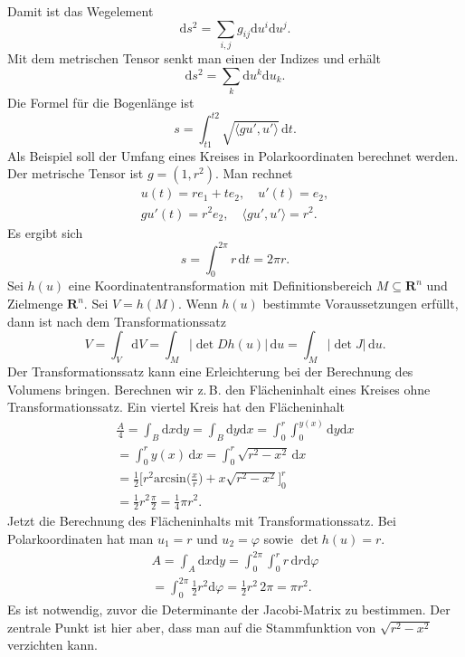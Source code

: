 \documentclass[a4paper,11pt,fleqn,twocolumn,twoside]{scrartcl}
\numberwithin{equation}{section}
\begin{document}
Damit ist das Wegelement
\begin{equation}
\mathrm ds^2 = \sum_{i,j} g_{ij}\mathrm du^i\mathrm du^j.
\end{equation}
Mit dem metrischen Tensor senkt man einen der Indizes
und erhält
\begin{equation}
\mathrm ds^2 = \sum_{k}\mathrm du^k\mathrm du_k.
\end{equation}
Die Formel für die Bogenlänge ist
\begin{equation}
s = \int_{t1}^{t2}
\sqrt{\langle gu',u'\rangle}\,\mathrm dt.
\end{equation}
%
Als Beispiel soll der Umfang eines Kreises in Polarkoordinaten
berechnet werden. Der metrische Tensor ist $g=(1,r^2)$.
Man rechnet
\begin{gather*}
u(t)=re_1+te_2,\quad
u'(t) = e_2,\\
gu'(t) = r^2e_2,\quad
\langle gu',u'\rangle = r^2.
\end{gather*}
Es ergibt sich
\begin{equation}
s = \int_0^{2\pi} r\,\mathrm dt = 2\pi r.
\end{equation}
%
Sei $h(u)$ eine Koordinatentransformation mit Definitionsbereich
$M\subseteq\mathbf R^n$ und Zielmenge $\mathbf R^n$.
Sei $V=h(M)$. Wenn $h(u)$ bestimmte Voraussetzungen erfüllt,
dann ist nach dem Transformationssatz
\begin{equation}
V = \int_V \mathrm dV = \int_M |{\det Dh(u)}|\,\mathrm du
= \int_M |{\det J}|\,\mathrm du.
\end{equation}
Der Transformationssatz kann eine Erleichterung bei der Berechnung
des Volumens bringen. Berechnen wir z.\,B. den Flächeninhalt eines
Kreises ohne Transformationssatz. Ein viertel Kreis hat den
Flächeninhalt
\begin{gather*}
\frac{A}{4} = \int_B \mathrm dx\mathrm dy
= \int_B \mathrm dy\mathrm dx
= \int_{0}^r\int_{0}^{y(x)} \mathrm dy\mathrm dx\\
= \int_{0}^r y(x)\,\mathrm dx
= \int_{0}^r \sqrt{r^2-x^2}\,\mathrm dx\\
= \frac{1}{2}\Big[r^2\mathrm{arcsin}\Big(\frac{x}{r}\Big)
+ x\sqrt{r^2-x^2}\Big]_0^r\\
= \frac{1}{2} r^2 \frac{\pi}{2}
= \frac{1}{4}\pi r^2.
\end{gather*}
Jetzt die Berechnung des Flächeninhalts mit Transformationssatz.
Bei Polarkoordinaten hat man $u_1=r$ und $u_2=\varphi$
sowie $\det h(u)=r$.
\begin{gather*}
A = \int_A \mathrm dx\mathrm dy
= \int_0^{2\pi}\int_0^r r\,\mathrm dr\mathrm d\varphi\\
= \int_0^{2\pi} \frac{1}{2}r^2\mathrm d\varphi
= \frac{1}{2}r^2\,2\pi = \pi r^2.
\end{gather*}
Es ist notwendig, zuvor die Determinante der Jacobi-Matrix zu
bestimmen. Der zentrale Punkt ist hier aber, dass man auf die
Stammfunktion von $\sqrt{r^2-x^2}$ verzichten kann.
\end{document}
